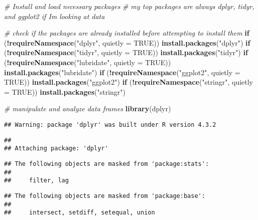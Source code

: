 \documentclass[
]{article}
\newenvironment{Shaded}{\begin{snugshade}}{\end{snugshade}}
\newcommand{\AttributeTok}[1]{\textcolor[rgb]{0.13,0.29,0.53}{#1}}
\newcommand{\CommentTok}[1]{\textcolor[rgb]{0.56,0.35,0.01}{\textit{#1}}}
\newcommand{\ConstantTok}[1]{\textcolor[rgb]{0.56,0.35,0.01}{#1}}
\newcommand{\ControlFlowTok}[1]{\textcolor[rgb]{0.13,0.29,0.53}{\textbf{#1}}}
\newcommand{\FunctionTok}[1]{\textcolor[rgb]{0.13,0.29,0.53}{\textbf{#1}}}
\newcommand{\NormalTok}[1]{#1}
\newcommand{\SpecialCharTok}[1]{\textcolor[rgb]{0.81,0.36,0.00}{\textbf{#1}}}
\newcommand{\StringTok}[1]{\textcolor[rgb]{0.31,0.60,0.02}{#1}}
\begin{document}
\begin{Shaded}
\begin{Highlighting}[]
\CommentTok{\# Install and load necessary packages}
\CommentTok{\# my top packages are always dplyr, tidyr, and ggplot2 if I\textquotesingle{}m looking at data}

\CommentTok{\# check if the packages are already installed before attempting to install them}
\ControlFlowTok{if}\NormalTok{ (}\SpecialCharTok{!}\FunctionTok{requireNamespace}\NormalTok{(}\StringTok{"dplyr"}\NormalTok{, }\AttributeTok{quietly =} \ConstantTok{TRUE}\NormalTok{)) }\FunctionTok{install.packages}\NormalTok{(}\StringTok{"dplyr"}\NormalTok{)}
\ControlFlowTok{if}\NormalTok{ (}\SpecialCharTok{!}\FunctionTok{requireNamespace}\NormalTok{(}\StringTok{"tidyr"}\NormalTok{, }\AttributeTok{quietly =} \ConstantTok{TRUE}\NormalTok{)) }\FunctionTok{install.packages}\NormalTok{(}\StringTok{"tidyr"}\NormalTok{)}
\ControlFlowTok{if}\NormalTok{ (}\SpecialCharTok{!}\FunctionTok{requireNamespace}\NormalTok{(}\StringTok{"lubridate"}\NormalTok{, }\AttributeTok{quietly =} \ConstantTok{TRUE}\NormalTok{)) }\FunctionTok{install.packages}\NormalTok{(}\StringTok{"lubridate"}\NormalTok{)}
\ControlFlowTok{if}\NormalTok{ (}\SpecialCharTok{!}\FunctionTok{requireNamespace}\NormalTok{(}\StringTok{"ggplot2"}\NormalTok{, }\AttributeTok{quietly =} \ConstantTok{TRUE}\NormalTok{)) }\FunctionTok{install.packages}\NormalTok{(}\StringTok{"ggplot2"}\NormalTok{)}
\ControlFlowTok{if}\NormalTok{ (}\SpecialCharTok{!}\FunctionTok{requireNamespace}\NormalTok{(}\StringTok{"stringr"}\NormalTok{, }\AttributeTok{quietly =} \ConstantTok{TRUE}\NormalTok{)) }\FunctionTok{install.packages}\NormalTok{(}\StringTok{"stringr"}\NormalTok{)}

\CommentTok{\# manipulate and analyze data frames}
\FunctionTok{library}\NormalTok{(dplyr)  }
\end{Highlighting}
\end{Shaded}

\begin{verbatim}
## Warning: package 'dplyr' was built under R version 4.3.2
\end{verbatim}

\begin{verbatim}
## 
## Attaching package: 'dplyr'
\end{verbatim}

\begin{verbatim}
## The following objects are masked from 'package:stats':
## 
##     filter, lag
\end{verbatim}

\begin{verbatim}
## The following objects are masked from 'package:base':
## 
##     intersect, setdiff, setequal, union
\end{verbatim}
\end{document}
